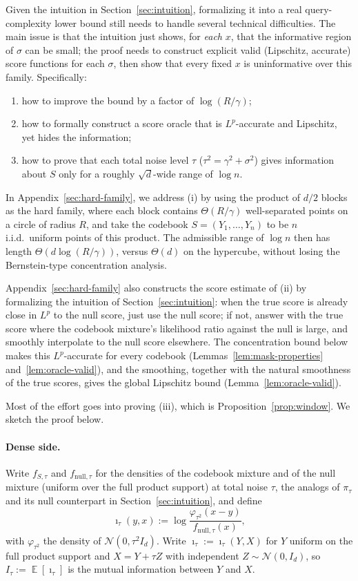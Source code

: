 \documentclass[11pt,letterpaper]{article}
\DeclareMathOperator*{\E}{\mathbb{E}}
\newcommand{\1}{\mathbbm{1}}
\begin{document}
Given the intuition in Section~\ref{sec:intuition}, formalizing it into a
real query-complexity lower bound still needs to handle several technical
difficulties.  The main issue is that the intuition just shows, for
\emph{each} $x$, that the informative region of $\sigma$ can be small; the
proof needs to construct explicit valid (Lipschitz, accurate) score
functions for each $\sigma$, then show that every fixed $x$ is uninformative
over this family.  Specifically:
\begin{enumerate}[label=(\roman*)]
  \item how to improve the bound by a factor of $\log(R/\gamma)$;
  \item how to formally construct a score oracle that is $L^p$-accurate and
        Lipschitz, yet hides the information;
  \item how to prove that each total noise level $\tau$
        ($\tau^2=\gamma^2+\sigma^2$) gives information about $S$ only for a
        roughly $\sqrt d$-wide range of $\log n$.
\end{enumerate}

In Appendix~\ref{sec:hard-family}, we address (i) by using the product of
$d/2$ blocks as the hard family, where each block contains
$\Theta(R/\gamma)$ well-separated points on a circle of radius $R$, and
take the codebook $S=(Y_1,\dots,Y_n)$ to be $n$ i.i.d.\ uniform points of
this product.  The
admissible range of $\log n$ then has length $\Theta(d\log(R/\gamma))$,
versus $\Theta(d)$ on the hypercube, without losing the Bernstein-type
concentration analysis.

Appendix~\ref{sec:hard-family} also constructs the score estimate of (ii)
by formalizing the intuition of Section~\ref{sec:intuition}: when the true
score is already close in $L^p$ to the null score, just use the null score;
if not, answer with the true score where the codebook mixture's likelihood
ratio against the null is large, and smoothly interpolate to the null score
elsewhere.  The concentration bound below makes this $L^p$-accurate for
every codebook (Lemmas~\ref{lem:mask-properties} and~\ref{lem:oracle-valid}),
and the smoothing, together with the natural smoothness of the true scores,
gives the global Lipschitz bound (Lemma~\ref{lem:oracle-valid}).

Most of the effort goes into proving (iii), which is
Proposition~\ref{prop:window}.  We sketch the proof below.

\paragraph{Dense side.}
Write $f_{S,\tau}$ and $f_{\mathrm{null},\tau}$ for the densities of the
codebook mixture and of the null mixture (uniform over the full product
support) at total noise $\tau$, the analogs of $\pi_\tau$ and its null
counterpart in Section~\ref{sec:intuition}, and define
\[
  \imath_\tau(y,x):=\log\frac{\varphi_{\tau^2}(x-y)}{f_{\mathrm{null},\tau}(x)},
\]
with $\varphi_{\tau^2}$ the density of $\mathcal N(0,\tau^2I_d)$.  Write
$\imath_\tau:=\imath_\tau(Y,X)$ for $Y$ uniform on the full product support
and $X=Y+\tau Z$ with independent $Z\sim\mathcal N(0,I_d)$, so
$I_\tau:=\E[\imath_\tau]$ is the mutual information between $Y$ and $X$.
\end{document}
